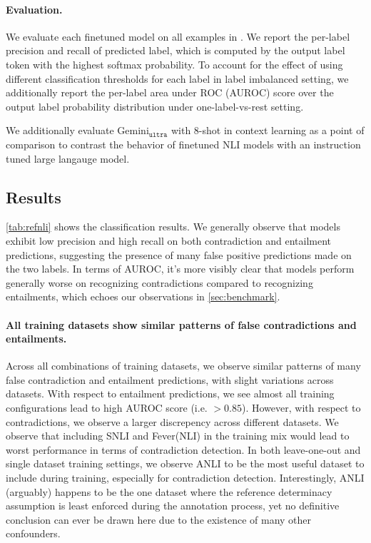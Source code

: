 \paragraph{Evaluation.} We evaluate each finetuned model on all examples in \datasetname. We report the per-label precision and recall of predicted label, which is computed by the output label token with the highest softmax probability. To account for the effect of using different classification thresholds for each label in label imbalanced setting, we additionally report the per-label area under ROC (AUROC) score over the output label probability distribution under one-label-vs-rest setting. 

We additionally evaluate Gemini$_{\texttt{ultra}}$ with 8-shot in context learning \cite{team2023gemini} as a point of comparison to contrast the behavior of finetuned NLI models with an instruction tuned large langauge model. 
\subsection{Results}
\autoref{tab:refnli} shows the classification results. We generally observe that models exhibit low precision and high recall on both contradiction and entailment predictions, suggesting the presence of many false positive predictions made on the two labels. In terms of AUROC, it's more visibly clear that models perform generally worse on recognizing contradictions compared to recognizing entailments, which echoes our observations in \cref{sec:benchmark}.

\paragraph{All training datasets show similar patterns of false contradictions and entailments.} Across all combinations of training datasets, we observe similar patterns of many false contradiction and entailment predictions, with slight variations across datasets. With respect to entailment predictions, we see almost all training configurations lead to high AUROC score (i.e. $>0.85$). However, with respect to contradictions, we observe a larger discrepency across different datasets. We observe that including SNLI and Fever(NLI) in the training mix would lead to worst performance in terms of contradiction detection.  In both leave-one-out and single dataset training settings, we observe ANLI to be the most useful dataset to include during training, especially for contradiction detection. Interestingly, ANLI (arguably) happens to be the one dataset where the reference determinacy assumption is least enforced during the annotation process, yet no definitive conclusion can ever be drawn here due to the existence of many other confounders.

